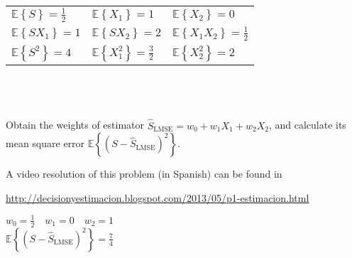 \begin{tabular}{lll}
$\mathbb E\left\lbrace S \right\rbrace=\displaystyle\frac{1}{2}$ & $\mathbb E\left\lbrace X_1 \right\rbrace=1$  & $\mathbb E\left\lbrace X_2 \right\rbrace=0$  \\

$\mathbb E\left\lbrace SX_1 \right\rbrace=1$ & $\mathbb E\left\lbrace SX_2 \right\rbrace=2$  & $\mathbb E\left\lbrace X_1X_2 \right\rbrace=\displaystyle\frac{1}{2}$  \\

$\mathbb E\left\lbrace S^2 \right\rbrace=4$ & $\mathbb E\left\lbrace X_1^2 \right\rbrace=\displaystyle\frac{3}{2}$  & $\mathbb E\left\lbrace X_2^2 \right\rbrace=2$  
\end{tabular}
\\ ~\\ ~\\
Obtain the weights of estimator  $\hat{S}_\text{LMSE}=w_0+w_{1}X_1+w_2X_2$, and calculate its mean square error $\mathbb E\left\lbrace(S-\hat{S}_\text{LMSE})^2\right\rbrace$.

\begin{solution}
A video resolution of this problem (in Spanish) can be found in 

\url{http://decisionyestimacion.blogspot.com/2013/05/p1-estimacion.html} 

$ w_0=\displaystyle\frac{1}{2} \quad w_1=0 \quad w_2=1$\\
$\mathbb E\left\lbrace(S-\hat{S}_\text{LMSE})^2\right\rbrace=\displaystyle\frac{7}{4}$
\end{solution}

\fi
